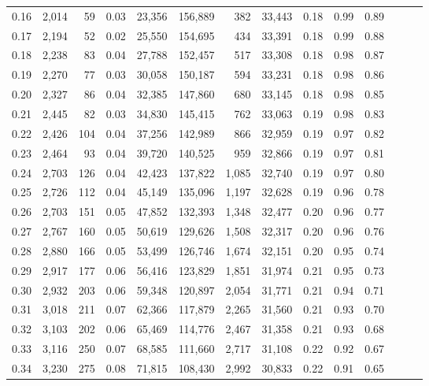 \begin{tabular}{rrrrrrrrrrrrrr}
0.16 &  2,014 &   59 &  0.03 &   23,356 &  156,889 &     382 &  33,443 &  0.18 &  0.99 &      0.89 \\
0.17 &  2,194 &   52 &  0.02 &   25,550 &  154,695 &     434 &  33,391 &  0.18 &  0.99 &      0.88 \\
0.18 &  2,238 &   83 &  0.04 &   27,788 &  152,457 &     517 &  33,308 &  0.18 &  0.98 &      0.87 \\
0.19 &  2,270 &   77 &  0.03 &   30,058 &  150,187 &     594 &  33,231 &  0.18 &  0.98 &      0.86 \\
0.20 &  2,327 &   86 &  0.04 &   32,385 &  147,860 &     680 &  33,145 &  0.18 &  0.98 &      0.85 \\
0.21 &  2,445 &   82 &  0.03 &   34,830 &  145,415 &     762 &  33,063 &  0.19 &  0.98 &      0.83 \\
0.22 &  2,426 &  104 &  0.04 &   37,256 &  142,989 &     866 &  32,959 &  0.19 &  0.97 &      0.82 \\
0.23 &  2,464 &   93 &  0.04 &   39,720 &  140,525 &     959 &  32,866 &  0.19 &  0.97 &      0.81 \\
0.24 &  2,703 &  126 &  0.04 &   42,423 &  137,822 &   1,085 &  32,740 &  0.19 &  0.97 &      0.80 \\
0.25 &  2,726 &  112 &  0.04 &   45,149 &  135,096 &   1,197 &  32,628 &  0.19 &  0.96 &      0.78 \\
0.26 &  2,703 &  151 &  0.05 &   47,852 &  132,393 &   1,348 &  32,477 &  0.20 &  0.96 &      0.77 \\
0.27 &  2,767 &  160 &  0.05 &   50,619 &  129,626 &   1,508 &  32,317 &  0.20 &  0.96 &      0.76 \\
0.28 &  2,880 &  166 &  0.05 &   53,499 &  126,746 &   1,674 &  32,151 &  0.20 &  0.95 &      0.74 \\
0.29 &  2,917 &  177 &  0.06 &   56,416 &  123,829 &   1,851 &  31,974 &  0.21 &  0.95 &      0.73 \\
0.30 &  2,932 &  203 &  0.06 &   59,348 &  120,897 &   2,054 &  31,771 &  0.21 &  0.94 &      0.71 \\
0.31 &  3,018 &  211 &  0.07 &   62,366 &  117,879 &   2,265 &  31,560 &  0.21 &  0.93 &      0.70 \\
0.32 &  3,103 &  202 &  0.06 &   65,469 &  114,776 &   2,467 &  31,358 &  0.21 &  0.93 &      0.68 \\
0.33 &  3,116 &  250 &  0.07 &   68,585 &  111,660 &   2,717 &  31,108 &  0.22 &  0.92 &      0.67 \\
0.34 &  3,230 &  275 &  0.08 &   71,815 &  108,430 &   2,992 &  30,833 &  0.22 &  0.91 &      0.65 \\

\end{tabular}

